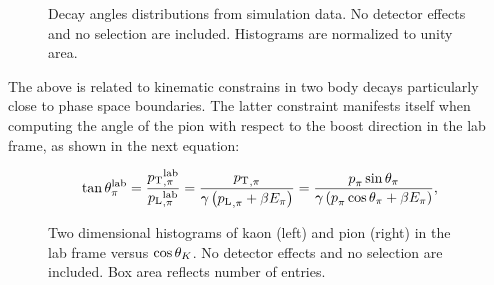 \begin{figure}[t]
  \centering
  \begin{subfigure}{0.33\textwidth}
    \scalebox{0.65}{}
    \caption{}
    \label{angDistr_ctk}
  \end{subfigure}%
  \hfill%
  \begin{subfigure}{0.33\textwidth}
    \scalebox{0.65}{}
    \caption{}
    \label{angDistr_ctl}
  \end{subfigure}%
  \hfill%
  \begin{subfigure}{0.33\textwidth}
    \scalebox{0.65}{}
    \caption{}
    \label{angDistr_phi}
  \end{subfigure}
  \caption{Decay angles distributions from simulation data. No detector effects and no selection are included.
           Histograms are normalized to unity area.}
  \label{angDistr_all}
\end{figure}

The above is related to kinematic constrains in two body decays particularly close to phase
space boundaries. The latter constraint manifests itself when computing the angle of the pion
with respect to the boost direction in the lab frame, as shown in the next equation:

\begin{equation}
  \centering
  \tan\thetapi^\lab = \frac{\ptrans{\pi}^\lab}{\plongd{\pi}^\lab}
               = \frac{\ptrans{\pi}}{\gamma\parenthesis{\plongd{\pi} + \beta E_\pi} }
               = \frac{\ptot_{\pi} \sin\thetapi}{\gamma\parenthesis{\ptot_{\pi} \cos\thetapi + \beta E_\pi} },
  \label{pi_angle}
\end{equation}

\begin{figure}[t]
  \centering
  \begin{subfigure}{0.49\textwidth}
    \raggedright
    \scalebox{1.15}{}
    \caption{}
    \label{ctk_kaon_pt}
  \end{subfigure}%
  \hfill%
  \begin{subfigure}{0.49\textwidth}
    \raggedleft
    \scalebox{1.15}{}
    \caption{}
    \label{ctk_pion_pt}
  \end{subfigure}
  \caption{Two dimensional histograms of kaon (left) and pion (right) \pt in the lab frame versus $\cos\theta_{K}$.
           No detector effects and no selection are included. Box area reflects number of entries.}
  \label{ctk_hadrons_pt}
\end{figure}

